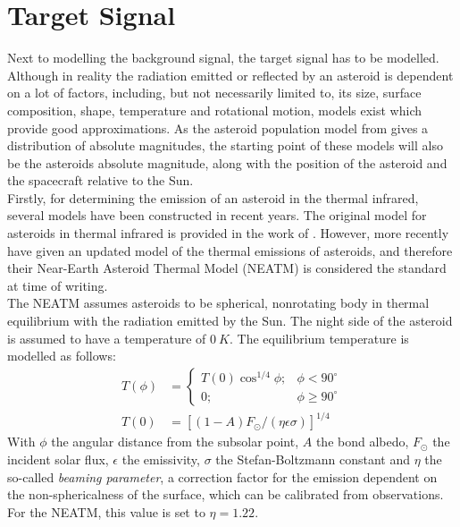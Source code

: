 \section{Target Signal}
\label{sec:modelling_target}
Next to modelling the background signal, the target signal has to be modelled. Although in reality the radiation emitted or reflected by an asteroid is dependent on a lot of factors, including, but not necessarily limited to, its size, surface composition, shape, temperature and rotational motion, models exist which provide good approximations. As the asteroid population model from \cite{GranvikPopulation} gives a distribution of absolute magnitudes, the starting point of these models will also be the asteroids absolute magnitude, along with the position of the asteroid and the spacecraft relative to the Sun. \\

Firstly, for determining the emission of an asteroid in the thermal infrared, several models have been constructed in recent years. The original model for asteroids in thermal infrared is provided in the work of \cite{AsteroidSTM}. However, more recently \cite{AsteroidNEATM} have given an updated model of the thermal emissions of asteroids, and therefore their Near-Earth Asteroid Thermal Model (NEATM) is considered the standard at time of writing. \\

The NEATM assumes asteroids to be spherical, nonrotating body in thermal equilibrium with the radiation emitted by the Sun. The night side of the asteroid is assumed to have a temperature of $0~K$. The equilibrium temperature is modelled as follows:
\begin{align}
 T(\phi) &= \begin{cases}
            T(0) \cos ^{1/4} \phi;& \phi < 90^\circ \\
            0;& \phi \geq 90^\circ
           \end{cases} \\
T(0) &= \left[(1-A)F_{\odot}/(\eta \epsilon \sigma)\right]^{1/4}
\end{align}
With $\phi$ the angular distance from the subsolar point, $A$ the bond albedo, $F_{\odot}$ the incident solar flux, $\epsilon$ the emissivity, $\sigma$ the Stefan-Boltzmann constant and $\eta$ the so-called \textit{beaming parameter}, a correction factor for the emission dependent on the non-sphericalness of the surface, which can be calibrated from observations. For the NEATM, this value is set to $\eta = 1.22$.\\


